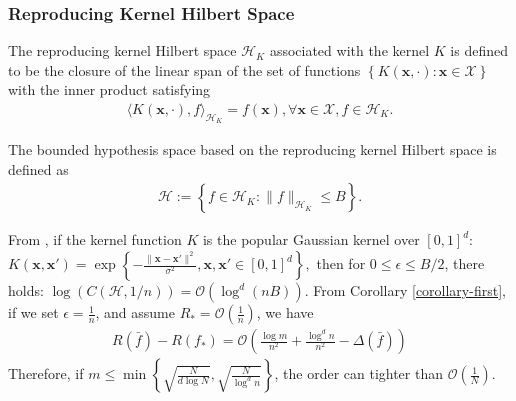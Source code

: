 \documentclass{article}
\begin{document}
\subsubsection{Reproducing Kernel Hilbert Space}
\label{subsection-3.2}
The reproducing kernel Hilbert space $\mathcal{H}_K$ associated with the kernel $K$ is
defined to be the closure of the linear span of the set of functions
$\left\{K(\mathbf x,\cdot):\mathbf x\in\mathcal{X}\right\}$ with the inner product satisfying
\begin{align*}
  \langle K(\mathbf x,\cdot), f\rangle_{\mathcal{H}_K}=f(\mathbf x), \forall \mathbf x\in\mathcal{X}, f\in\mathcal{H}_K.
\end{align*}

The bounded hypothesis space based on the reproducing kernel Hilbert space is defined as
\begin{align*}
  \mathcal{H}:=\left\{f\in\mathcal{H}_{K}: \|f\|_{\mathcal{H}_K}\leq B\right\}.
\end{align*}

From \cite{zhou2002covering}, if the kernel function $K$ is the popular Gaussian kernel over $[0,1]^d$:
$
  K(\mathbf x,\mathbf x')=\exp\left\{-\frac{\|\mathbf x-\mathbf x'\|^2}{\sigma^2}, \mathbf x,\mathbf x' \in[0,1]^d \right\},
$
then for $0\leq \epsilon\leq B/2$, there holds:
$
 \log \left(C(\mathcal{H},1/n)\right)=\mathcal{O}\left(\log^d(nB)\right).$
From Corollary \ref{corollary-first}, if we set $\epsilon=\frac{1}{n}$, and assume $R_\ast=\mathcal{O}\left(\frac{1}{n}\right)$,
we have
\begin{align*}
  R(\bar{f})-R(f_\ast)=\mathcal{O}\left(\frac{\log m}{n^2}+\frac{\log^d n}{n^2}-
  \Delta(\bar{f})\right)
\end{align*}
Therefore, if $m\leq \min\left\{\sqrt{\frac{N}{d\log N}}, \sqrt{\frac{N}{\log^d n}}\right\}$,
the order can tighter than
$\mathcal{O}\left(\frac{1}{N}\right)$.
\end{document}
